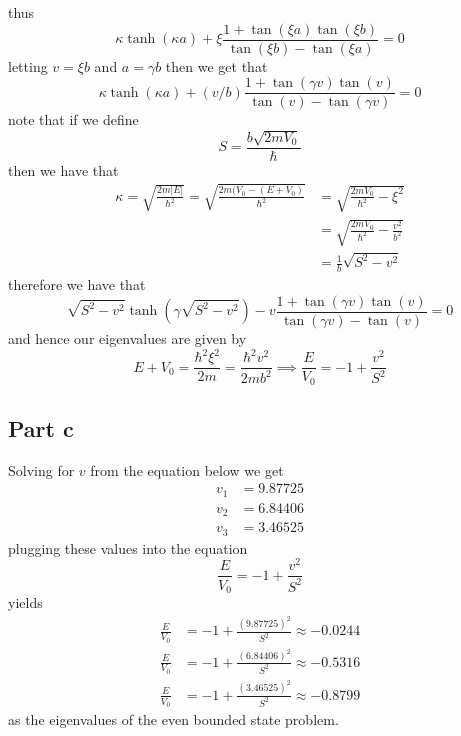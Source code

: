 \documentclass[12pt]{report}
\begin{document}
thus
\begin{equation*}
\kappa \tanh(\kappa a) + \xi \frac{1 + \tan(\xi a)\tan(\xi b)}{\tan(\xi b) - \tan(\xi a)} = 0
\end{equation*}
letting $v = \xi b$ and $a = \gamma b$ then we get that
\begin{equation*}
    \kappa \tanh(\kappa a) + (v/b) \frac{1 + \tan(\gamma v)\tan(v)}{\tan(v) - \tan(\gamma v)} = 0
\end{equation*}
note that if we define
\begin{equation*}
    S = \frac{b\sqrt{2mV_0}}{\hbar}
\end{equation*}
then we have that
\begin{align*}
    \kappa = \sqrt{\frac{2m|E|}{\hbar^2}} =\sqrt{\frac{2m(V_0 - (E + V_0)}{\hbar^2}} &= \sqrt{\frac{2mV_0}{\hbar^2} -\xi^2} \\
    &= \sqrt{\frac{2mV_0}{\hbar^2} -\frac{v^2}{b^2}} \\
    &= \frac{1}{b} \sqrt{S^2 - v^2}
\end{align*}
therefore we have that
\begin{equation*}
   \sqrt{S^2 - v^2} \tanh(\gamma \sqrt{S^2 - v^2}) - v \frac{1 + \tan(\gamma v)\tan(v)}{\tan(\gamma v) - \tan(v)} = 0
\end{equation*}
and hence our eigenvalues are given by
\begin{equation*}
    E + V_0 = \frac{\hbar^2 \xi^2}{2m} = \frac{\hbar^2 v^2}{2mb^2} \implies \frac{E}{V_0} = -1 + \frac{v^2}{S^2}
\end{equation*}
\subsection*{Part c}
Solving for $v$ from the equation below we get
\begin{align*}
    v_1 &= 9.87725 \\
    v_2 &= 6.84406 \\
    v_3 &= 3.46525 
\end{align*}
plugging these values into the equation
\begin{equation*}
    \frac{E}{V_0} = -1 + \frac{v^2}{S^2} 
\end{equation*}
yields
\begin{align*}
     \frac{E}{V_0} &= -1 + \frac{(9.87725)^2}{S^2} \approx -0.0244\\
      \frac{E}{V_0} &= -1 + \frac{(6.84406)^2}{S^2} \approx -0.5316\\
       \frac{E}{V_0} &= -1 + \frac{(3.46525)^2}{S^2} \approx -0.8799
\end{align*}
as the eigenvalues of the even bounded state problem.
\end{document}
